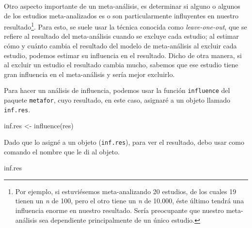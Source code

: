 \documentclass[
  bookmarksnumbered]{article}
\newenvironment{Shaded}{\begin{snugshade}}{\end{snugshade}}
\newcommand{\FunctionTok}[1]{\textcolor[rgb]{0.39,0.29,0.61}{#1}}
\newcommand{\NormalTok}[1]{\textcolor[rgb]{0.12,0.11,0.11}{#1}}
\newcommand{\OtherTok}[1]{\textcolor[rgb]{0.00,0.43,0.16}{#1}}
\begin{document}
Otro aspecto importante de un meta-análisis, es determinar si alguno o algunos de los estudios meta-analizados es o son particularmente influyentes en nuestro resultado\footnote{Por ejemplo, si estuviésemos meta-analizando 20 estudios, de los cuales 19 tienen un \emph{n} de 100, pero el otro tiene un \emph{n} de 10.000, éste último tendrá una influencia enorme en nuestro resultado. Sería preocupante que nuestro meta-análisis sea dependiente principalmente de un único estudio.}. Para esto, se suele usar la técnica conocida como \emph{leave-one-out}, que se refiere al resultado del meta-análisis cuando se excluye cada estudio; al estimar cómo y cuánto cambia el resultado del modelo de meta-análisis al excluir cada estudio, podemos estimar su influencia en el resultado. Dicho de otra manera, si al excluir un estudio el resultado cambia mucho, sabemos que ese estudio tiene gran influencia en el meta-análisis y sería mejor excluirlo.

Para hacer un análisis de influencia, podemos usar la función \texttt{influence} del paquete \texttt{metafor}, cuyo resultado, en este caso, asignaré a un objeto llamado \texttt{inf.res}.

\begin{Shaded}
\begin{Highlighting}[]
\NormalTok{inf.res }\OtherTok{\textless{}{-}} \FunctionTok{influence}\NormalTok{(res)}
\end{Highlighting}
\end{Shaded}

Dado que lo asigné a un objeto (\texttt{inf.res}), para ver el resultado, debo usar como comando el nombre que le di al objeto.

\begin{Shaded}
\begin{Highlighting}[]
\NormalTok{inf.res}
\end{Highlighting}
\end{Shaded}
\end{document}
